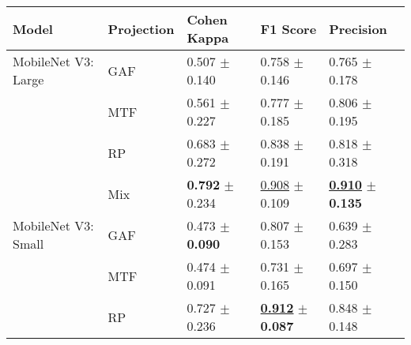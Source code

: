 
\begin{tabular}[t]{lllll}
\toprule
Model & Projection & Cohen Kappa & F1 Score & Precision \\
\midrule
MobileNet V3: Large & GAF & \textcolor[rgb]{0.8927157561,0.1072842439,0}{0.507} $\pm$ \textcolor[rgb]{0.2718412315,0.5000000000,0}{0.140} & \textcolor[rgb]{0.8489208633,0.1510791367,0}{0.758} $\pm$ \textcolor[rgb]{0.5671384454,0.4328615546,0}{0.146} & \textcolor[rgb]{0.5337995338,0.4662004662,0}{0.765} $\pm$ \textcolor[rgb]{0.2345974767,0.5000000000,0}{0.178} \\
 & MTF & \textcolor[rgb]{0.7244655582,0.2755344418,0}{0.561} $\pm$ \textcolor[rgb]{0.7534589401,0.2465410599,0}{0.227} & \textcolor[rgb]{0.7476685318,0.2523314682,0}{0.777} $\pm$ \textcolor[rgb]{0.9388727094,0.0611272906,0}{0.185} & \textcolor[rgb]{0.3846153846,0.5000000000,0}{0.806} $\pm$ \textcolor[rgb]{0.3297922028,0.5000000000,0}{0.195} \\
 & RP & \textcolor[rgb]{0.3396674584,0.5000000000,0}{0.683} $\pm$ \textcolor[rgb]{1.0000000000,0.0000000000,0}{0.272} & \textcolor[rgb]{0.4076738609,0.5000000000,0}{0.838} $\pm$ \textcolor[rgb]{1.0000000000,0.0000000000,0}{0.191} & \textcolor[rgb]{0.3379953380,0.5000000000,0}{0.818} $\pm$ \textcolor[rgb]{1.0000000000,0.0000000000,0}{0.318} \\
 & Mix & \textbf{\textcolor[rgb]{0.0000000000,0.5000000000,0}{0.792}} $\pm$ \textcolor[rgb]{0.7942442572,0.2057557428,0}{0.234} & \underline{\textcolor[rgb]{0.0207833733,0.5000000000,0}{0.908}} $\pm$ \textcolor[rgb]{0.2113812866,0.5000000000,0}{0.109} & \underline{\textbf{\textcolor[rgb]{0.0000000000,0.5000000000,0}{0.910}}} $\pm$ \textbf{\textcolor[rgb]{0.0000000000,0.5000000000,0}{0.135}} \\
MobileNet V3: Small & GAF & \textcolor[rgb]{1.0000000000,0.0000000000,0}{0.473} $\pm$ \textbf{\textcolor[rgb]{0.0000000000,0.5000000000,0}{0.090}} & \textcolor[rgb]{0.5824340528,0.4175659472,0}{0.807} $\pm$ \textcolor[rgb]{0.6312580337,0.3687419663,0}{0.153} & \textcolor[rgb]{1.0000000000,0.0000000000,0}{0.639} $\pm$ \textcolor[rgb]{0.8063363991,0.1936636009,0}{0.283} \\
 & MTF & \textcolor[rgb]{0.9972288203,0.0027711797,0}{0.474} $\pm$ \textcolor[rgb]{0.0053005756,0.5000000000,0}{0.091} & \textcolor[rgb]{1.0000000000,0.0000000000,0}{0.731} $\pm$ \textcolor[rgb]{0.7425368432,0.2574631568,0}{0.165} & \textcolor[rgb]{0.7855477855,0.2144522145,0}{0.697} $\pm$ \textcolor[rgb]{0.0832310645,0.5000000000,0}{0.150} \\
 & RP & \textcolor[rgb]{0.2019002375,0.5000000000,0}{0.727} $\pm$ \textcolor[rgb]{0.8031342191,0.1968657809,0}{0.236} & \underline{\textbf{\textcolor[rgb]{0.0000000000,0.5000000000,0}{0.912}}} $\pm$ \textbf{\textcolor[rgb]{0.0000000000,0.5000000000,0}{0.087}} & \textcolor[rgb]{0.2261072261,0.5000000000,0}{0.848} $\pm$ \textcolor[rgb]{0.0716703012,0.5000000000,0}{0.148} \\

\end{tabular}
